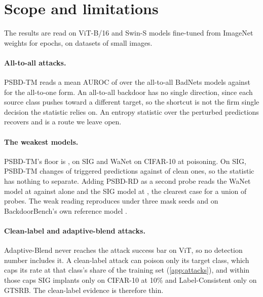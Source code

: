 \section{Scope and limitations}
\label{sec:limitations}

The results are read on \PanelCellsCached{} ViT-B/16 and \SwinCells{} Swin-S models fine-tuned from ImageNet weights for \TrainingEpochs{} epochs, on datasets of small images.

\paragraph{All-to-all attacks.}
PSBD-TM reads a mean AUROC of \ATwoaPsuAuroc{} over the \ATwoaCells{} all-to-all BadNets models against \ATwooPsuAuroc{} for the all-to-one form. An all-to-all backdoor has no single direction, since each source class pushes toward a different target, so the shortcut is not the firm single decision the statistic relies on. An entropy statistic over the perturbed predictions recovers \ATwoaEntropyAuroc{} and is a route we leave open.

\paragraph{The weakest models.}
PSBD-TM's floor is \HeadlineFloorAuroc{}, on SIG and WaNet on CIFAR-10 at \PanelRateHigh{} poisoning. On SIG, PSBD-TM changes \SurvivalTmSigTriggered{} of triggered predictions against \SurvivalTmClean{} of clean ones, so the statistic has nothing to separate. Adding PSBD-RD as a second probe reads the WaNet model at \ProbeUnionWanetCifarOneZeroTmRd{} against \ProbeUnionWanetCifarOneZeroTm{} alone and the SIG model at \ProbeUnionSigCifarOneZeroTmRd{}, the clearest case for a union of probes. The weak reading reproduces under three mask seeds and on BackdoorBench's own reference model \cite{wu2022backdoorbench}.

\paragraph{Clean-label and adaptive-blend attacks.}
Adaptive-Blend never reaches the attack success bar on ViT, so no detection number includes it. A clean-label attack can poison only its target class, which caps its rate at that class's share of the training set (\cref{app:attacks}), and within those caps SIG implants only on CIFAR-10 at 10\% and Label-Consistent only on GTSRB. The clean-label evidence is therefore thin.

